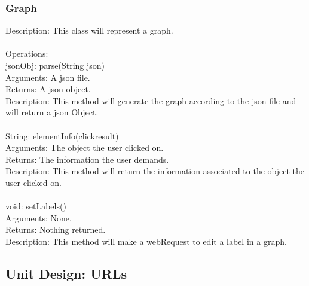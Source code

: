 \documentclass[12pt]{extarticle}
\begin{document}
\subsubsection{Graph}
Description: This class will represent a graph. \\ \\
Operations: \\
    jsonObj: parse(String json) \\
    Arguments: A json file. \\
	Returns: A json object. \\
	Description: This method will generate the graph according to the json file and will return a json Object. \\ \\
	String: elementInfo(clickresult) \\
    Arguments: The object the user clicked on. \\
	Returns: The information the user demands. \\
	Description: This method will return the information associated to the object the user clicked on. \\ \\
	void: setLabels() \\
    Arguments: None. \\
	Returns: Nothing returned. \\
	Description: This method will make a webRequest to edit a label in a graph. \\
	
	
\subsection{Unit Design: URLs}
\end{document}
